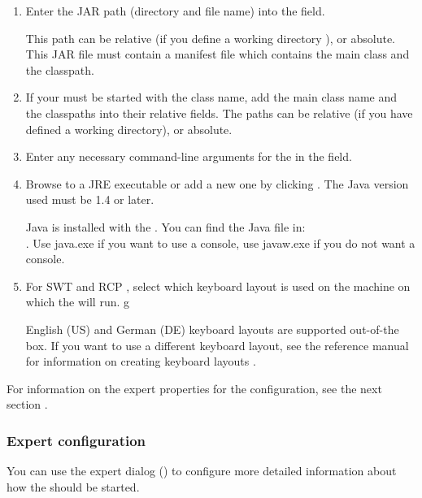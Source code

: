 \begin{enumerate}
\item Enter the JAR path (directory and file
  name) into the  field.  

This path can be relative (if you define a working directory ), or absolute. This JAR file must contain a manifest file which contains the main class and the classpath. 

\item If your \gdaut{} must be started with the class name, add the main class name and the classpaths into their relative fields. The paths can be relative (if you have defined a working directory), or absolute. 
\item Enter any necessary command-line arguments for the \gdaut{} in the
  field. 
\item Browse to a JRE executable or add a new one by clicking . 
The Java version used must be 1.4 or later. 

Java is installed with the \ite{}. You can find the Java file in:\\
.
Use java.exe if you want to use a console, use javaw.exe if you do not want a console. 
\item For SWT and RCP \gdauts{}, select which keyboard layout is used on the machine on which the \gdaut{} will run. 
g

English (US) and German (DE) keyboard layouts are supported out-of-the box. If you want to use a different keyboard layout, see the reference manual for information on creating keyboard layouts . 
\end{enumerate}
For information on the expert properties for the \gdaut{} configuration, see the next section . 

\subsubsection{Expert \gdaut{} configuration}
\label{ExpertAUTConfig}
You can use the expert dialog () to configure more detailed information about how the \gdaut{} should be started. 

